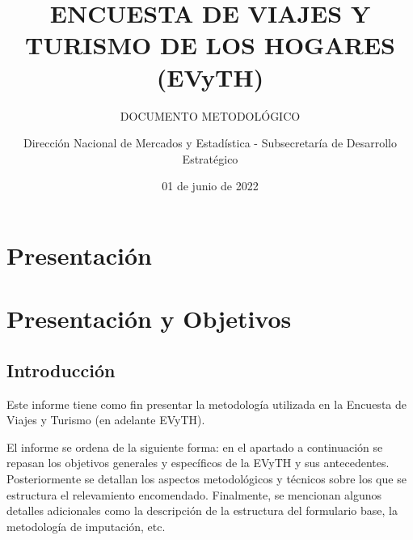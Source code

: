 \documentclass[
  openany]{book}
\title{ENCUESTA DE VIAJES Y TURISMO DE LOS HOGARES (EVyTH)}
\subtitle{DOCUMENTO METODOLÓGICO}
\author{Dirección Nacional de Mercados y Estadística - Subsecretaría de Desarrollo Estratégico}
\date{01 de junio de 2022}
\let\oldmaketitle\maketitle
\begin{document}
\maketitle


\newpage

\let\maketitle\oldmaketitle
\maketitle

{
\setcounter{tocdepth}{1}
\tableofcontents
}
\hypertarget{presentaciuxf3n}{%
\chapter*{Presentación}\label{presentaciuxf3n}}

\hypertarget{section}{%
\subsection*{}\label{section}}

\hypertarget{presentacion-objetivos}{%
\chapter{\texorpdfstring{\textbf{Presentación y Objetivos}}{Presentación y Objetivos}}\label{presentacion-objetivos}}

\hypertarget{introducciuxf3n}{%
\section{Introducción}\label{introducciuxf3n}}

Este informe tiene como fin presentar la metodología utilizada en la Encuesta de Viajes y Turismo (en adelante EVyTH).

El informe se ordena de la siguiente forma: en el apartado a continuación se repasan los objetivos generales y específicos de la EVyTH y sus antecedentes. Posteriormente se detallan los aspectos metodológicos y técnicos sobre los que se estructura el relevamiento encomendado. Finalmente, se mencionan algunos detalles adicionales como la descripción de la estructura del formulario base, la metodología de imputación, etc.
\end{document}
